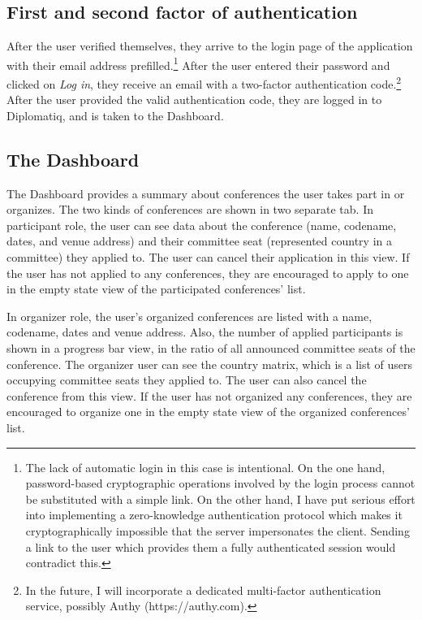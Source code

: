 \subsection{First and second factor of authentication}

After the user verified themselves, they arrive to the login page of the application with their email address prefilled.\footnote{The lack of automatic login in this case is intentional. On the one hand, password-based cryptographic operations involved by the login process cannot be substituted with a simple link. On the other hand, I have put serious effort into implementing a zero-knowledge authentication protocol which makes it cryptographically impossible that the server impersonates the client. Sending a link to the user which provides them a fully authenticated session would contradict this.} After the user entered their password and clicked on \emph{Log in}, they receive an email with a two-factor authentication code.\footnote{In the future, I will incorporate a dedicated multi-factor authentication service, possibly Authy (https://authy.com).} After the user provided the valid authentication code, they are logged in to Diplomatiq, and is taken to the Dashboard.

\subsection{The Dashboard}

The Dashboard provides a summary about conferences the user takes part in or organizes. The two kinds of conferences are shown in two separate tab. In participant role, the user can see data about the conference (name, codename, dates, and venue address) and their committee seat (represented country in a committee) they applied to. The user can cancel their application in this view. If the user has not applied to any conferences, they are encouraged to apply to one in the empty state view of the participated conferences' list.

In organizer role, the user's organized conferences are listed with a name, codename, dates and venue address. Also, the number of applied participants is shown in a progress bar view, in the ratio of all announced committee seats of the conference. The organizer user can see the country matrix, which is a list of users occupying committee seats they applied to. The user can also cancel the conference from this view. If the user has not organized any conferences, they are encouraged to organize one in the empty state view of the organized conferences' list.

